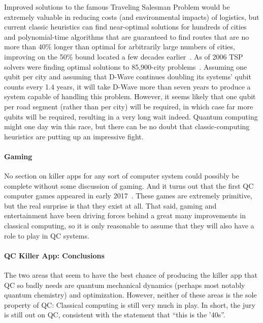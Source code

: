 Improved solutions to the famous Traveling Salesman Problem would
be extremely valuable in reducing costs (and environmental impacts)
of logistics, but current classic heuristics can find near-optimal
solutions for hundreds of cities~\cite{Martin:1992:LMC:2307953.2308141}
and polynomial-time algorithms that are guaranteed to find routes
that are no more than 40\% longer than optimal for arbitrarily
large numbers of cities\cite{Sebo:2014:STN:2688265.2688281},
improving on the 50\% bound located a few decades
earlier~\cite{NicosChristofides1976TSP-FiftyPercent}.
As of 2006 TSP solvers were finding optimal solutions to
85,900-city problems~\cite{DLApplegate2007TSPtextbook}.
Assuming one qubit per city and assuming that D-Wave continues doubling
its systems' qubit counts every 1.4 years, it will take D-Wave more than seven
years to produce a system capable of handling this problem.
However, it seems likely that one qubit per road segment (rather than per city)
will be required, in which case far more qubits will be required,
resulting in a very long wait indeed.
Quantum computing might one day win this race, but there can be no doubt that
classic-computing heuristics are putting up an impressive fight.

\paragraph{Gaming}
\label{sec:future:Gaming}

No section on killer apps for any sort of computer system could possibly
be complete without some discussion of gaming.
And it turns out that the first QC computer games appeared in early
2017~\cite{JamesWootton2017IBMQEgame,JamesWootton2017IBMQEbattleship}.
These games are extremely primitive, but the real surprise is that
they exist at all.
That said, gaming and entertainment have been driving forces
behind a great many improvements in classical computing, so it is
only reasonable to assume that they will also have a role to play
in QC systems.

\paragraph{QC Killer App: Conclusions}
\label{sec:future:QC Killer App: Conclusions}

The two areas that seem to have the best chance of producing the killer
app that QC so badly needs are quantum mechanical dynamics (perhaps
most notably quantum chemistry) and optimization.
However, neither of these areas is the sole property of QC: Classical
computing is still very much in play.
In short, the jury is still out on QC, consistent with the
statement that ``this is the '40s''.

